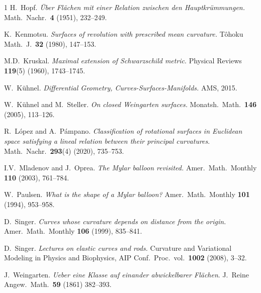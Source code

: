 \documentclass[leqno,11pt]{amsart}
\theoremstyle{definition}
\numberwithin{equation}{section}
\begin{document}
\begin{thebibliography}{1}
 H.~Hopf.
{\em \"{U}ber Fl\"{a}chen mit einer Relation zwischen den Hauptkr\"{ummungen}.}
Math.\ Nachr.\ {\bf 4} (1951), 232--249.

 K.~Kenmotsu.
{\em Surfaces of revolution with prescribed mean curvature.}
T\^{o}hoku  Math.\ J.\ {\bf 32} (1980), 147--153.

 M.D.~Kruskal.
{\em Maximal extension of Schwarzschild metric}. Physical Reviews \textbf{119}(5) (1960), 1743--1745.

 W.~Kühnel.
{\em Differential Geometry, Curves-Surfaces-Manifolds.}
AMS, 2015.

 W.~Kühnel and M.~Steller.
{\em On closed Weingarten surfaces.}
Monatsh.\ Math.\ {\bf 146} (2005), 113--126.

 R.~L\'opez and A.~P\'ampano.
{\em Classification of rotational surfaces in Euclidean space satisfying a lineal relation between their principal curvatures}. 
Math.\ Nachr.\  \textbf{293}(4) (2020), 735--753.

 I.V.~Mladenov and J.~Oprea.
{\em The Mylar balloon revisited.}
Amer.\ Math.\ Monthly {\bf 110} (2003), 761--784.

 W.~Paulsen.
{\em What is the shape of a Mylar balloon?} 
Amer.\ Math.\ Monthly \textbf{101} (1994), 953--958.

 D.~Singer.
{\em Curves whose curvature depends on distance from the origin.}
Amer.\ Math.\ Monthly {\bf 106} (1999), 835--841.

 D.~Singer.
{\em Lectures on elastic curves and rods.}
Curvature and Variational Modeling in Physics and Biophysics,
AIP Conf.\ Proc.\ vol.\ {\bf 1002} (2008), 3--32.

 J.~Weingarten. 
{\em Ueber eine Klasse auf einander abwickelbarer Fl\"{a}chen}. 
J.\ Reine Angew.\ Math.\, \textbf{59} (1861) 382--393.

\end{thebibliography}
\end{document}
